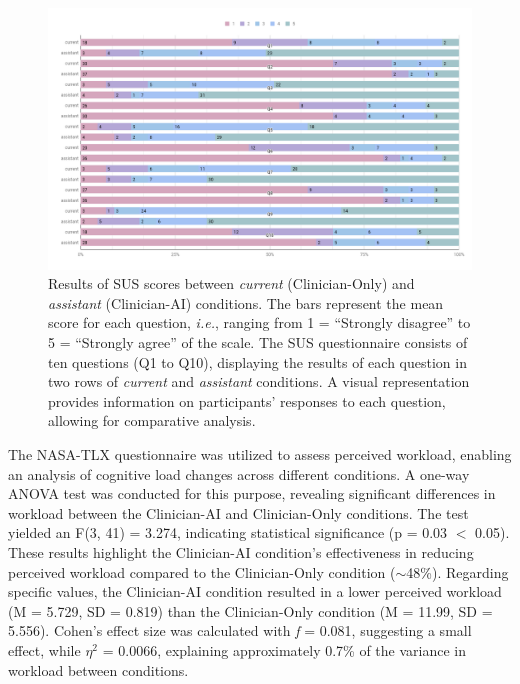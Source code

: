 \begin{figure}[ht]
\centering
\includegraphics[width=\columnwidth]{images/fig109}
\caption{Results of SUS scores between {\it current} (Clinician-Only) and {\it assistant} (Clinician-AI) conditions. The bars represent the mean score for each question, {\it i.e.}, ranging from 1 = ``Strongly disagree'' to 5 = ``Strongly agree'' of the scale. The SUS questionnaire consists of ten questions (Q1 to Q10), displaying the results of each question in two rows of {\it current} and {\it assistant} conditions. A visual representation provides information on participants' responses to each question, allowing for comparative analysis.}
\label{fig:fig109}
\end{figure}

\textcolor{revised}{The \ac{NASA-TLX} questionnaire was utilized to assess perceived workload, enabling an analysis of cognitive load changes across different conditions.
A one-way \ac{ANOVA} test was conducted for this purpose, revealing significant differences in workload between the Clinician-AI and Clinician-Only conditions.
The test yielded an F(3, 41) = 3.274, indicating statistical significance (p = 0.03 $<$ 0.05).
These results highlight the Clinician-AI condition's effectiveness in reducing perceived workload compared to the Clinician-Only condition ($\sim$48\%).
Regarding specific values, the Clinician-AI condition resulted in a lower perceived workload (M = 5.729, SD = 0.819) than the Clinician-Only condition (M = 11.99, SD = 5.556).
Cohen's effect size was calculated with {\it f} = 0.081, suggesting a small effect, while $\eta^{2}$ = 0.0066, explaining approximately 0.7\% of the variance in workload between conditions.}

